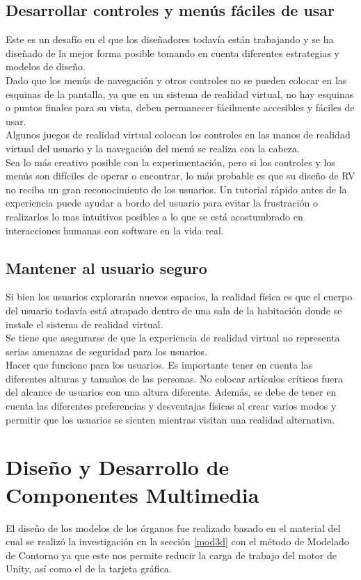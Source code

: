 \subsection{Desarrollar controles y menús fáciles de usar}
Este es un desafío en el que los diseñadores todavía están trabajando y se ha diseñado de la mejor forma posible tomando en cuenta diferentes estrategias y modelos de diseño.\\
Dado que los menús de navegación y otros controles no se pueden colocar en las esquinas de la pantalla, ya que en un sistema de realidad virtual, no hay esquinas o puntos finales 
para su vista, deben permanecer fácilmente accesibles y fáciles de usar.\\
Algunos juegos de realidad virtual colocan los controles en las manos de realidad virtual del usuario y la navegación del menú se realiza con la cabeza.\\
Sea lo más creativo posible con la experimentación, pero si los controles y los menús son difíciles de operar o encontrar, lo más probable es que su diseño de RV no reciba un gran 
reconocimiento de los usuarios. Un tutorial rápido antes de la experiencia puede ayudar a bordo del usuario para evitar la frustración o realizarlos lo mas intuitivos
posibles a lo que se est\'a acostumbrado en interacciones humanas con software en la vida real.

\subsection{Mantener al usuario seguro}
Si bien los usuarios explorarán nuevos espacios, la realidad física es que el cuerpo del usuario todavía está atrapado dentro de una sala de la habitación donde se instale el sistema 
de realidad virtual.\\
Se tiene que asegurarse de que la experiencia de realidad virtual no representa serias amenazas de seguridad para los usuarios.\\
Hacer que funcione para los usuarios. Es importante tener en cuenta las diferentes alturas y tamaños de las personas. No colocar artículos críticos fuera del alcance de usuarios con 
una altura diferente. Además, se debe de tener en cuenta las diferentes preferencias y desventajas físicas al crear varios modos y permitir que los usuarios se sienten mientras visitan 
una realidad alternativa.

\section{Diseño y Desarrollo de Componentes Multimedia}
El diseño de los modelos de los \'organos fue realizado basado en el material del cual se realiz\'o la investigación en la sección \ref{mod3d} con el método de
Modelado de Contorno ya que este nos permite reducir la carga de trabajo del motor de Unity, así como el de la tarjeta gráfica.\\

